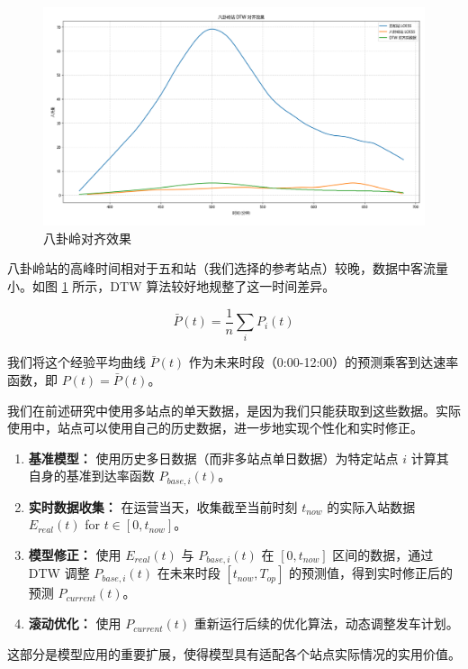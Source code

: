 \begin{figure}[htbp]
    \centering
    \includegraphics[width=1.0\textwidth]{res/Figure_5.png}
    \caption{八卦岭对齐效果}
    \label{fig:alignedBagualing}
\end{figure}

八卦岭站的高峰时间相对于五和站（我们选择的参考站点）较晚，数据中客流量小。如图 \ref{fig:alignedBagualing} 所示，DTW 算法较好地规整了这一时间差异。

$$
\bar{P}(t) = \frac{1}{n} \sum_{i} P_i(t)
$$

我们将这个经验平均曲线 $\bar{P}(t)$ 作为未来时段（0:00-12:00）的预测乘客到达速率函数，即 $P(t) = \bar{P}(t)$。


我们在前述研究中使用多站点的单天数据，是因为我们只能获取到这些数据。实际使用中，站点可以使用自己的历史数据，进一步地实现个性化和实时修正。
\begin{enumerate}
    \item \textbf{基准模型：} 使用历史多日数据（而非多站点单日数据）为特定站点 $i$ 计算其自身的基准到达率函数 $P_{base, i}(t)$。
    \item \textbf{实时数据收集：} 在运营当天，收集截至当前时刻 $t_{now}$ 的实际入站数据 $E_{real}(t)$ for $t \in [0, t_{now}]$。
    \item \textbf{模型修正：} 使用 $E_{real}(t)$ 与 $P_{base, i}(t)$ 在 $[0, t_{now}]$ 区间的数据，通过 DTW 调整 $P_{base, i}(t)$ 在未来时段 $[t_{now}, T_{op}]$ 的预测值，得到实时修正后的预测 $P_{current}(t)$。
    \item \textbf{滚动优化：} 使用 $P_{current}(t)$ 重新运行后续的优化算法，动态调整发车计划。
\end{enumerate}
这部分是模型应用的重要扩展，使得模型具有适配各个站点实际情况的实用价值。

